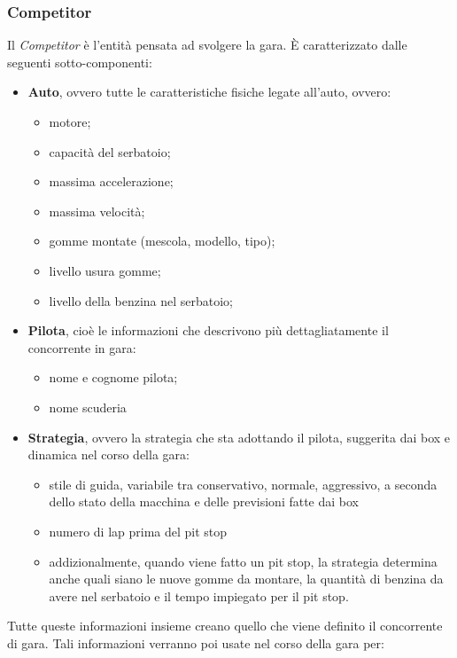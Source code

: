 \subsubsection{Competitor}
\label{competitor}
Il \emph{Competitor} \`{e} l'entit\`{a} pensata ad svolgere la gara. \`{E} caratterizzato dalle seguenti sotto-componenti:
\begin{itemize}
\item \textbf{Auto}, ovvero tutte le caratteristiche fisiche legate all'auto, ovvero:
	\begin{itemize}
		\item motore;
		\item capacit\`{a} del serbatoio;
		\item massima accelerazione;
		\item massima velocit\`{a};
		\item gomme montate (mescola, modello, tipo);
		\item livello usura gomme;
		\item livello della benzina nel serbatoio;
	\end{itemize}
\item \textbf{Pilota}, cio\`{e} le informazioni che descrivono pi\`{u} dettagliatamente il concorrente in gara:
	\begin{itemize}
		\item nome e cognome pilota;
		\item nome scuderia
	\end{itemize}
\item \textbf{Strategia}, ovvero la strategia che sta adottando il pilota, suggerita dai box e dinamica nel corso della gara:
	\begin{itemize}
		\item stile di guida, variabile tra conservativo, normale, aggressivo, a seconda dello stato della macchina e delle
			previsioni fatte dai box
		\item numero di lap prima del pit stop
		\item addizionalmente, quando viene fatto un pit stop, la strategia determina anche quali siano le nuove gomme da montare,
		 	la quantit\`{a} di benzina da avere nel serbatoio e il tempo impiegato per il pit stop.
	\end{itemize}
\end{itemize}
Tutte queste informazioni insieme creano quello che viene definito il concorrente di gara. 
Tali informazioni verranno poi usate nel corso della gara per:
